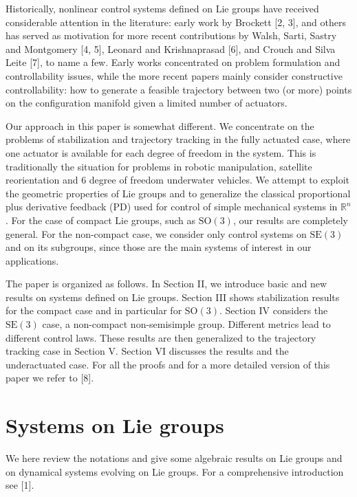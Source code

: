 \documentclass[10pt,twocolumn]{article}
\newcommand{\SO}{\mathrm{SO}}
\newcommand{\SE}{\mathrm{SE}}
\newcommand{\R}{\mathbb R}
\begin{document}
Historically, nonlinear control systems defined on Lie groups have received considerable attention in the literature: early work by Brockett [2, 3], and others has served as motivation for more recent contributions by Walsh, Sarti, Sastry and Montgomery [4, 5], Leonard and Krishnaprasad [6], and Crouch and Silva Leite [7], to name a few. Early works concentrated on problem formulation and controllability issues, while the more recent papers mainly consider constructive controllability: how to generate a feasible trajectory between two (or more) points on the configuration manifold given a limited number of actuators.

Our approach in this paper is somewhat different. We concentrate on the problems of stabilization and trajectory tracking in the fully actuated case, where one actuator is available for each degree of freedom in the system. This is traditionally the situation for problems in robotic manipulation, satellite reorientation and 6 degree of freedom underwater vehicles. We attempt to exploit the geometric properties of Lie groups and to generalize the classical proportional plus derivative feedback (PD) used for control of simple mechanical systems in $\R^n$. For the case of compact Lie groups, such as $\SO(3)$, our results are completely general. For the non-compact case, we consider only control systems on $\SE(3)$ and on its subgroups, since those are the main systems of interest in our applications.

The paper is organized as follows. In Section II, we introduce basic and new results on systems defined on Lie groups. Section III shows stabilization results for the compact case and in particular for $\SO(3)$. Section IV considers the $\SE(3)$ case, a non-compact non-semisimple group. Different metrics lead to different control laws. These results are then generalized to the trajectory tracking case in Section V. Section VI discusses the results and the underactuated case. For all the proofs and for a more detailed version of this paper we refer to [8].

\section{Systems on Lie groups}
We here review the notations and give some algebraic results on Lie groups and on dynamical systems evolving on Lie groups. For a comprehensive introduction see [1].
\end{document}
